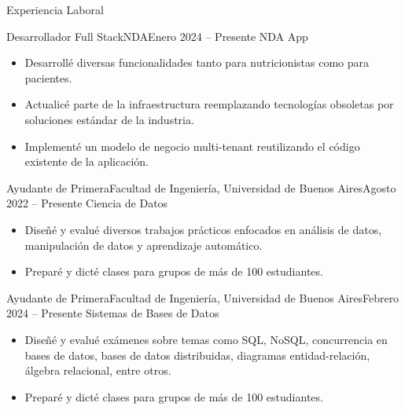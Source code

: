 \documentclass[]{mcdowellcv}
\begin{document}
	\makeheader
	
	\begin{cvsection}{Experiencia Laboral}
		\begin{cvsubsection}{Desarrollador Full Stack}{NDA}{Enero 2024 -- Presente}
			NDA App
			\begin{itemize}
				\item Desarrollé diversas funcionalidades tanto para nutricionistas como para pacientes.
				\item Actualicé parte de la infraestructura reemplazando tecnologías obsoletas por soluciones estándar de la industria.
				\item Implementé un modelo de negocio multi-tenant reutilizando el código existente de la aplicación.
			\end{itemize}
		\end{cvsubsection}
		
		\begin{cvsubsection}{Ayudante de Primera}{Facultad de Ingeniería, Universidad de Buenos Aires}{Agosto 2022 -- Presente}
			Ciencia de Datos
			\begin{itemize}
				\item Diseñé y evalué diversos trabajos prácticos enfocados en análisis de datos, manipulación de datos y aprendizaje automático.
				\item Preparé y dicté clases para grupos de más de 100 estudiantes.
			\end{itemize}
		\end{cvsubsection}
		
		\begin{cvsubsection}{Ayudante de Primera}{Facultad de Ingeniería, Universidad de Buenos Aires}{Febrero 2024 -- Presente}
			Sistemas de Bases de Datos
			\begin{itemize}
				\item Diseñé y evalué exámenes sobre temas como SQL, NoSQL, concurrencia en bases de datos, bases de datos distribuidas, diagramas entidad-relación, álgebra relacional, entre otros.
				\item Preparé y dicté clases para grupos de más de 100 estudiantes.
			\end{itemize}
		\end{cvsubsection}
	\end{cvsection}
	
\end{document}
